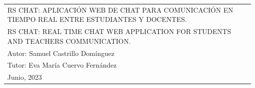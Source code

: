 \begin{table}[ht]
\begin{tabular}{p{1\linewidth}}
		\LARGE{\uppercase{RS Chat: Aplicación web de chat para comunicación en tiempo real entre estudiantes y docentes.}}
		\\[5ex]

		\LARGE{\uppercase{RS Chat: Real time chat web application for students and teachers communication.}}
		\\[6ex]

		\hfill\large{Autor: Samuel Castrillo Domínguez}
		\\[3pt]
		\hfill\large{Tutor: Eva María Cuervo Fernández}
		\\[5ex]

		\huge{Junio, 2023}
	\end{tabular}
\end{table}
